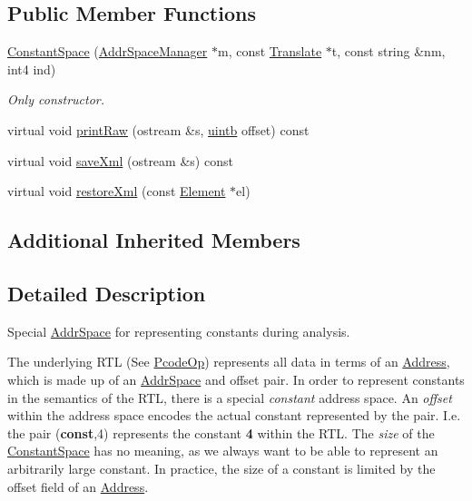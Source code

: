 \subsection*{Public Member Functions}
\begin{DoxyCompactItemize}
\item 
\mbox{\hyperlink{class_constant_space_ab1b9a4284b23978bc625ddca04ca59ec}{Constant\+Space}} (\mbox{\hyperlink{class_addr_space_manager}{Addr\+Space\+Manager}} $\ast$m, const \mbox{\hyperlink{class_translate}{Translate}} $\ast$t, const string \&nm, int4 ind)
\begin{DoxyCompactList}\small\item\em Only constructor. \end{DoxyCompactList}\item 
virtual void \mbox{\hyperlink{class_constant_space_aed7e05a3024887280f12e0d7082c769e}{print\+Raw}} (ostream \&s, \mbox{\hyperlink{types_8h_a2db313c5d32a12b01d26ac9b3bca178f}{uintb}} offset) const
\item 
virtual void \mbox{\hyperlink{class_constant_space_a8af99121cbd9e7cea687d2a54cb98157}{save\+Xml}} (ostream \&s) const
\item 
virtual void \mbox{\hyperlink{class_constant_space_ae29b82af12a38637ded7c4b1c57d7367}{restore\+Xml}} (const \mbox{\hyperlink{class_element}{Element}} $\ast$el)
\end{DoxyCompactItemize}
\subsection*{Additional Inherited Members}


\subsection{Detailed Description}
Special \mbox{\hyperlink{class_addr_space}{Addr\+Space}} for representing constants during analysis. 

The underlying R\+TL (See \mbox{\hyperlink{class_pcode_op}{Pcode\+Op}}) represents all data in terms of an \mbox{\hyperlink{class_address}{Address}}, which is made up of an \mbox{\hyperlink{class_addr_space}{Addr\+Space}} and offset pair. In order to represent constants in the semantics of the R\+TL, there is a special {\itshape constant} address space. An {\itshape offset} within the address space encodes the actual constant represented by the pair. I.\+e. the pair ({\bfseries{const}},4) represents the constant {\bfseries{4}} within the R\+TL. The {\itshape size} of the \mbox{\hyperlink{class_constant_space}{Constant\+Space}} has no meaning, as we always want to be able to represent an arbitrarily large constant. In practice, the size of a constant is limited by the offset field of an \mbox{\hyperlink{class_address}{Address}}. 

